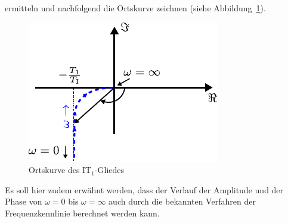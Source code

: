 %
ermitteln und nachfolgend die Ortskurve zeichnen (siehe Abbildung~\ref{fig:OrtskurveIT1}).
%
\begin{figure}[h!]
	\centering
	\includegraphics[width=0.50\linewidth]{Abbildungen/Systemanalyse/PDF/OrtskurveIT1.pdf}
	\caption{Ortskurve des IT$_{1}$-Gliedes}
	\label{fig:OrtskurveIT1}
\end{figure}
%
Es soll hier zudem erwähnt werden, dass der Verlauf der Amplitude und der Phase von $\omega=0$ bis $\omega=\infty$ auch durch die bekannten Verfahren der Frequenzkennlinie berechnet werden kann. 
%
